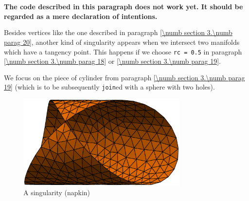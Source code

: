 \section{~~}\label{\numb section 3.\numb parag 21}

{\normalfont\bfseries The code described in this paragraph does not work yet.
It should be regarded as a mere declaration of intentions.}
\medskip

Besides vertices like the one described in paragraph \ref{\numb section 3.\numb parag 20},
another kind of singularity appears when we intersect two manifolds which have a tangency point.
This happens if we choose {\small\tt rc = 0.5} in paragraph \ref{\numb section 3.\numb parag 18}
or \ref{\numb section 3.\numb parag 19}.

We focus on the piece of cylinder from paragraph \ref{\numb section 3.\numb parag 19}
(which is to be subsequently {\small\tt join}ed with a sphere with two holes).

\begin{figure}[ht] \centering
 \includegraphics[width=85mm]{cyl}
  \caption{A singularity (napkin)}
  \label{\numb section 3.\numb fig 9}
\end{figure}

